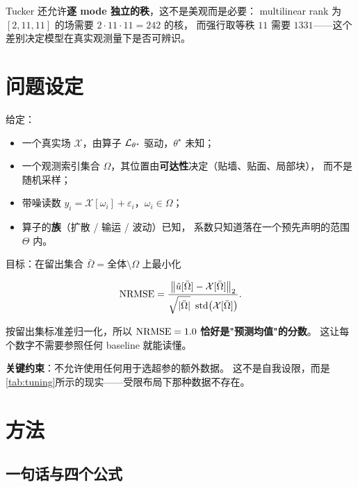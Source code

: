 \documentclass[11pt,a4paper]{article}
\begin{document}
Tucker 还允许\textbf{逐 mode 独立的秩}，这不是美观而是必要：
multilinear rank 为 $[2, 11, 11]$ 的场需要 $2 \cdot 11 \cdot 11 = 242$ 的核，
而强行取等秩 $11$ 需要 $1331$——这个差别决定模型在真实观测量下是否可辨识。

\section{问题设定}
\label{sec:setting}

给定：

\begin{itemize}[nosep,leftmargin=1.6em]
  \item 一个真实场 $\mathcal{X}$，由算子 $\mathcal{L}_{\theta^\star}$ 驱动，$\theta^\star$ 未知；
  \item 一个观测索引集合 $\Omega$，其位置由\textbf{可达性}决定（贴墙、贴面、局部块），
        而不是随机采样；
  \item 带噪读数 $y_i = \mathcal{X}[\omega_i] + \varepsilon_i$，$\omega_i \in \Omega$；
  \item 算子的\textbf{族}（扩散 / 输运 / 波动）已知，
        系数只知道落在一个预先声明的范围 $\Theta$ 内。
\end{itemize}

目标：在留出集合 $\bar{\Omega} = \text{全体} \setminus \Omega$ 上最小化

\begin{equation}
\NRMSE = \frac{\bigl\lVert \hat{u}[\bar{\Omega}] - \mathcal{X}[\bar{\Omega}] \bigr\rVert_2}
              {\sqrt{\lvert \bar{\Omega} \rvert}\ \operatorname{std}\bigl(\mathcal{X}[\bar{\Omega}]\bigr)} .
\label{eq:nrmse}
\end{equation}

按留出集标准差归一化，所以 $\mathrm{NRMSE} = 1.0$ \textbf{恰好是"预测均值"的分数}。
这让每个数字不需要参照任何 baseline 就能读懂。

\textbf{关键约束}：不允许使用任何用于选超参的额外数据。
这不是自我设限，而是\cref{tab:tuning}所示的现实——受限布局下那种数据不存在。

\section{方法}

\subsection{一句话与四个公式}
\end{document}
